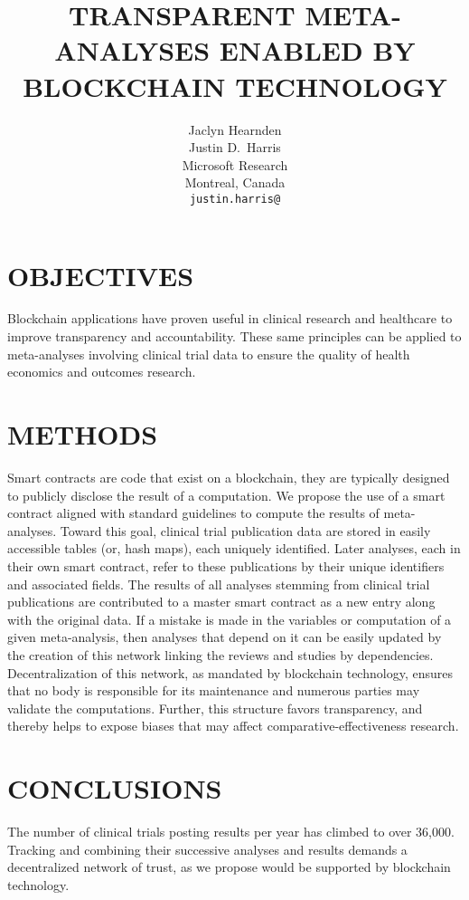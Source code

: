 \documentclass{article}
\title{TRANSPARENT META-ANALYSES ENABLED BY BLOCKCHAIN TECHNOLOGY}
\author{
  Jaclyn Hearnden \\
   \And
  Justin D.~Harris \\
  Microsoft Research\\
  Montreal, Canada \\
  \texttt{justin.harris@}
}
\begin{document}
\maketitle



\section{OBJECTIVES}
\label{sec:objectives}
Blockchain applications have proven useful in clinical research and healthcare to improve transparency and accountability.
These same principles can be applied to meta-analyses involving clinical trial data to ensure the quality of health economics and outcomes research.


\section{METHODS}
\label{sec:methods}
Smart contracts are code that exist on a blockchain, they are typically designed to publicly disclose the result of a computation.
We propose the use of a smart contract aligned with standard guidelines to compute the results of meta-analyses.
Toward this goal, clinical trial publication data are stored in easily accessible tables (or, hash maps), each uniquely identified.
Later analyses, each in their own smart contract, refer to these publications by their unique identifiers and associated fields.
The results of all analyses stemming from clinical trial publications are contributed to a master smart contract as a new entry along with the original data.
If a mistake is made in the variables or computation of a given meta-analysis, then analyses that depend on it can be easily updated by the creation of this network linking the reviews and studies by dependencies.
Decentralization of this network, as mandated by blockchain technology, ensures that no body is responsible for its maintenance and numerous parties may validate the computations.
Further, this structure favors transparency, and thereby helps to expose biases that may affect comparative-effectiveness research.

\section{CONCLUSIONS}
\label{sec:conclusions}
The number of clinical trials posting results per year has climbed to over 36,000.
Tracking and combining their successive analyses and results demands a decentralized network of trust, as we propose would be supported by blockchain technology. 

  

\end{document}

